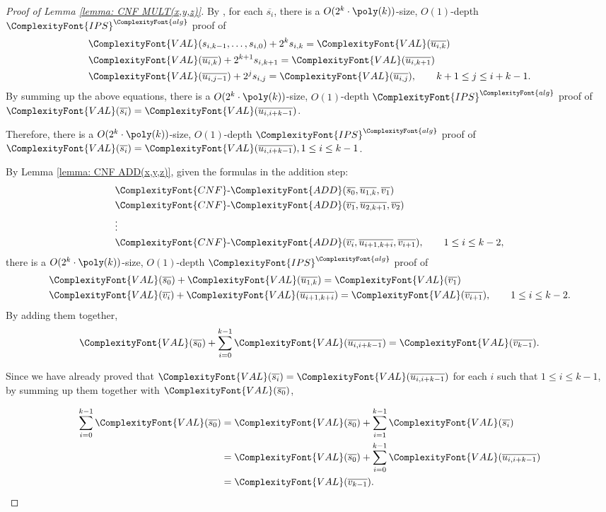 \documentclass[11pt,letter]{article}
\theoremstyle{remark} %
\newcommand{\alg}{\ComplexityFont{alg}}
\newcommand{\IPS}{%
    {
        \ComplexityFont{IPS} 
    }
}
\newcommand{\CNF}{ %
    {
        \ComplexityFont{CNF}
    }
}
\newcommand{\VAL}{ %
    {
        \ComplexityFont{VAL}
    }
}
\newcommand{\add}{ %
    {
        \ComplexityFont{ADD}
    }
}
\begin{document}
{\begin{proof}[Proof of Lemma \ref{lemma: CNF MULT(x,y,z)}]
    By , for each $\overline{s_i}$, there is a $O(2^k\cdot \poly(k))$-size, $O(1)$-depth $\IPS^\alg$ proof of
    \begin{align*}
        &\VAL(s_{i,k-1},\dots,s_{i,0})+2^k s_{i,k} =\VAL(\overline{u_{i,k}}) \\
        &\VAL(\overline{u_{i,k}}) + 2^{k+1}  s_{i,k+1} = \VAL(\overline{u_{i,k+1}})\\
        &\VAL(\overline{u_{i,j-1}}) + 2^j s_{i,j} = \VAL(\overline{u_{i,j}}), \qquad k+1 \leq j \leq i+k-1.
    \end{align*}
    By summing up the above equations, there is a $O(2^k \cdot \poly(k))$-size, $O(1)$-depth $\IPS^\alg$ proof of $\VAL(\overline{s_i})=\VAL(\overline{u_{i,i+k-1}})$.

    Therefore, there is a $O(2^k \cdot \poly(k))$-size, $O(1)$-depth $\IPS^\alg$ proof of $\VAL(\overline{s_i})=\VAL(\overline{u_{i,i+k-1}}), 1 \leq i \leq k-1$.


    By Lemma \ref{lemma: CNF ADD(x,y,z)}, given the formulas in the addition step:
    \begin{align*}
        &\CNF\text{-}\add(\overline{s_0},\overline{u_{1,k}},\overline{v_1})\\
        &\CNF\text{-}\add(\overline{v_1},\overline{u_{2,k+1}},\overline{v_2})\\
        &\vdots\\
        &\CNF\text{-}\add(\overline{v_i},\overline{u_{i+1,k+i}},\overline{v_{i+1}}),\qquad 1 \leq i \leq k-2,
    \end{align*}
    there is a $O(2^k \cdot \poly(k))$-size, $O(1)$-depth $\IPS^\alg$ proof of 
    \begin{align*}
        &\VAL(\overline{s_0}) +\VAL(\overline{u_{1,k}}) = \VAL(\overline{v_1})\\
        &\VAL(\overline{v_i})+\VAL(\overline{u_{i+1,k+i}}) = \VAL(\overline{v_{i+1}}),\qquad 1 \leq i \leq k-2.
    \end{align*}
    By adding them together, 
    \begin{equation*}
        \VAL(\overline{s_0}) + \sum_{i=0}^{k-1}\VAL(\overline{u_{i,i+k-1}})= \VAL(\overline{v_{k-1}}).
    \end{equation*}
    
    Since we have already proved that $\VAL(\overline{s_i})=\VAL(\overline{u_{i,i+k-1}})$ for each $i$ such that $1 \leq i \leq k-1$, by summing up them together with $\VAL(\overline{s_0})$, 

    \begin{align*}
        \sum_{i=0}^{k-1}\VAL(\overline{s_0}) &= \VAL(\overline{s_0}) + \sum_{i=1}^{k-1} \VAL(\overline{s_i}) \\
        & = \VAL(\overline{s_0}) + \sum_{i=0}^{k-1}\VAL(\overline{u_{i,i+k-1}}) \\
        &= \VAL(\overline{v_{k-1}}).
    \end{align*}
  

\end{proof}}
\end{document}

